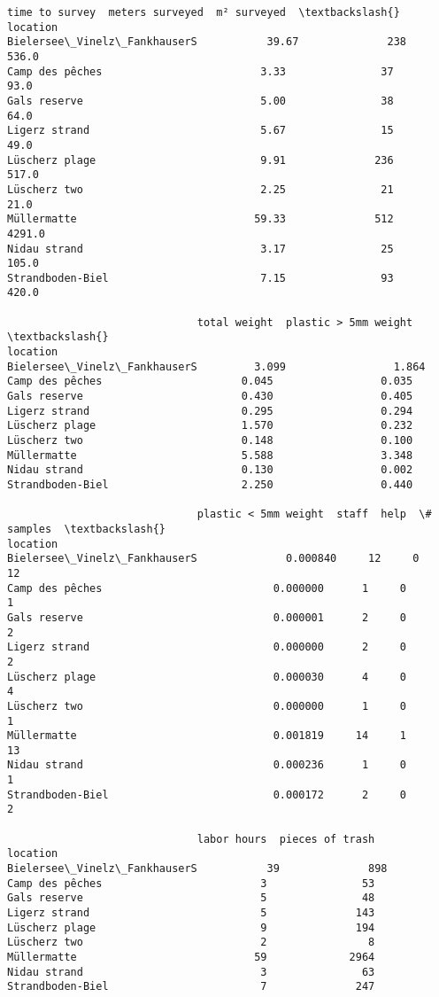 \documentclass[11pt]{article}
\begin{document}
            \begin{tcolorbox}[breakable, size=fbox, boxrule=.5pt, pad at break*=1mm, opacityfill=0]
\begin{Verbatim}[commandchars=\\\{\}]
                              time to survey  meters surveyed  m² surveyed  \textbackslash{}
location
Bielersee\_Vinelz\_FankhauserS           39.67              238        536.0
Camp des pêches                         3.33               37         93.0
Gals reserve                            5.00               38         64.0
Ligerz strand                           5.67               15         49.0
Lüscherz plage                          9.91              236        517.0
Lüscherz two                            2.25               21         21.0
Müllermatte                            59.33              512       4291.0
Nidau strand                            3.17               25        105.0
Strandboden-Biel                        7.15               93        420.0

                              total weight  plastic > 5mm weight  \textbackslash{}
location
Bielersee\_Vinelz\_FankhauserS         3.099                 1.864
Camp des pêches                      0.045                 0.035
Gals reserve                         0.430                 0.405
Ligerz strand                        0.295                 0.294
Lüscherz plage                       1.570                 0.232
Lüscherz two                         0.148                 0.100
Müllermatte                          5.588                 3.348
Nidau strand                         0.130                 0.002
Strandboden-Biel                     2.250                 0.440

                              plastic < 5mm weight  staff  help  \# samples  \textbackslash{}
location
Bielersee\_Vinelz\_FankhauserS              0.000840     12     0         12
Camp des pêches                           0.000000      1     0          1
Gals reserve                              0.000001      2     0          2
Ligerz strand                             0.000000      2     0          2
Lüscherz plage                            0.000030      4     0          4
Lüscherz two                              0.000000      1     0          1
Müllermatte                               0.001819     14     1         13
Nidau strand                              0.000236      1     0          1
Strandboden-Biel                          0.000172      2     0          2

                              labor hours  pieces of trash
location
Bielersee\_Vinelz\_FankhauserS           39              898
Camp des pêches                         3               53
Gals reserve                            5               48
Ligerz strand                           5              143
Lüscherz plage                          9              194
Lüscherz two                            2                8
Müllermatte                            59             2964
Nidau strand                            3               63
Strandboden-Biel                        7              247
\end{Verbatim}
\end{tcolorbox}
        
\end{document}
